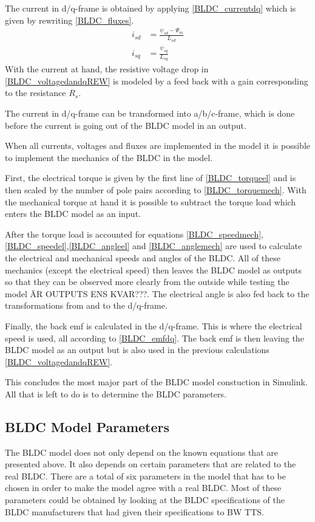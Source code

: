 \documentclass{LTHthesis}
\begin{document}
The current in d/q-frame is obtained by applying \eqref{BLDC_currentdq} which is given by rewriting \eqref{BLDC_fluxes}.
\begin{subequations} \label{BLDC_currentdq}
\begin{align}
i_{sd}&=\frac{\psi_{sd}-\Psi_m}{L_{sd}}\\
i_{sq}&=\frac{\psi_{sq}}{L_{sq}}
\end{align}
\end{subequations}
With the current at hand, the resistive voltage drop in \eqref{BLDC_voltagedandqREW} is modeled by a feed back with a gain corresponding to the resistance $R_s$.

The current in d/q-frame can be transformed into a/b/c-frame, which is done before the current is going out of the BLDC model in an output.

When all currents, voltages and fluxes are implemented in the model it is possible to implement the mechanics of the BLDC in the model.

First, the electrical torque is given by the first line of \eqref{BLDC_torqueel} and is then scaled by the number of pole pairs according to \eqref{BLDC_torquemech}. With the mechanical torque at hand it is possible to subtract the torque load which enters the BLDC model as an input.

After the torque load is accounted for equations \eqref{BLDC_speedmech}, \eqref{BLDC_speedel},\eqref{BLDC_angleel} and \eqref{BLDC_anglemech} are used to calculate the electrical and mechanical speeds and angles of the BLDC. All of these mechanics (except the electrical speed) then leaves the BLDC model as outputs so that they can be observed more clearly from the outside while testing the model ÄR OUTPUTS ENS KVAR???. The electrical angle is also fed back to the transformations from and to the d/q-frame. 

Finally, the back emf is calculated in the d/q-frame. This is where the electrical speed is used, all according to \eqref{BLDC_emfdq}. The back emf is then leaving the BLDC model as an output but is also used in the previous calculations \eqref{BLDC_voltagedandqREW}.

This concludes the most major part of the BLDC model constuction in Simulink. All that is left to do is to determine the BLDC parameters. 

\subsection{BLDC Model Parameters}
The BLDC model does not only depend on the known equations that are presented above. It also depends on certain parameters that are related to the real BLDC. There are a total of six parameters in the model that has to be chosen in order to make the model agree with a real BLDC. Most of these parameters could be obtained by looking at the BLDC specifications of the BLDC manufacturers that had given their specifications to BW TTS.
\end{document}
